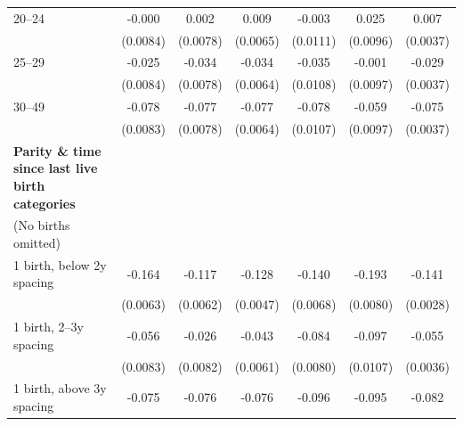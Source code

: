 {\begin{tabular}{l*{6}{c}}
\addlinespace
\hspace*{1em}20–24               &      -0.000        &       0.002        &       0.009\sym{*} &      -0.003        &       0.025\sym{**}&       0.007\sym{*} \\
                    &    (0.0084)        &    (0.0078)        &    (0.0065)        &    (0.0111)        &    (0.0096)        &    (0.0037)        \\
\addlinespace
\hspace*{1em}25–29               &      -0.025\sym{**}&      -0.034\sym{**}&      -0.034\sym{**}&      -0.035\sym{**}&      -0.001        &      -0.029\sym{**}\\
                    &    (0.0084)        &    (0.0078)        &    (0.0064)        &    (0.0108)        &    (0.0097)        &    (0.0037)        \\
\addlinespace
\hspace*{1em}30–49               &      -0.078\sym{**}&      -0.077\sym{**}&      -0.077\sym{**}&      -0.078\sym{**}&      -0.059\sym{**}&      -0.075\sym{**}\\
                    &    (0.0083)        &    (0.0078)        &    (0.0064)        &    (0.0107)        &    (0.0097)        &    (0.0037)        \\
\addlinespace
\textbf{Parity \& time since last live birth categories} \\ (No births omitted)&                    &                    &                    &                    &                    &                    \\
\addlinespace
\hspace*{1em}1 birth, below 2y spacing&      -0.164\sym{**}&      -0.117\sym{**}&      -0.128\sym{**}&      -0.140\sym{**}&      -0.193\sym{**}&      -0.141\sym{**}\\
                    &    (0.0063)        &    (0.0062)        &    (0.0047)        &    (0.0068)        &    (0.0080)        &    (0.0028)        \\
\addlinespace
\hspace*{1em}1 birth, 2–3y spacing&      -0.056\sym{**}&      -0.026\sym{**}&      -0.043\sym{**}&      -0.084\sym{**}&      -0.097\sym{**}&      -0.055\sym{**}\\
                    &    (0.0083)        &    (0.0082)        &    (0.0061)        &    (0.0080)        &    (0.0107)        &    (0.0036)        \\
\addlinespace
\hspace*{1em}1 birth, above 3y spacing&      -0.075\sym{**}&      -0.076\sym{**}&      -0.076\sym{**}&      -0.096\sym{**}&      -0.095\sym{**}&      -0.082\sym{**}\\

\end{tabular}}
